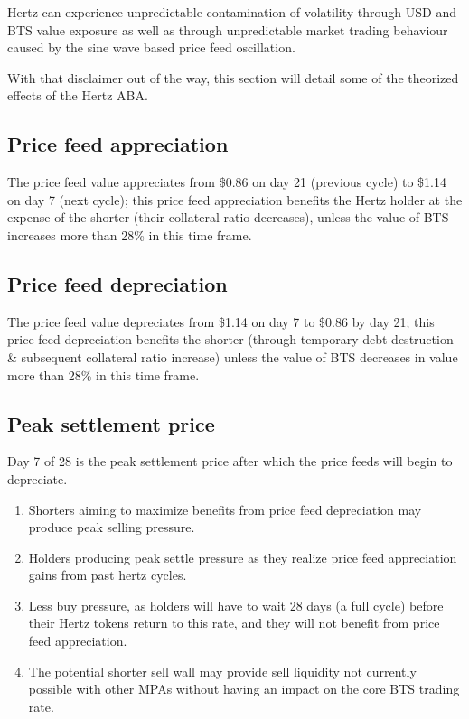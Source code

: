 \documentclass[sigconf]{acmart}
\begin{document}
Hertz can experience unpredictable contamination of volatility through USD and BTS value exposure as well as through unpredictable market trading behaviour caused by the sine wave based price feed oscillation.

With that disclaimer out of the way, this section will detail some of the theorized effects of the Hertz ABA.

\subsection{Price feed appreciation}

The price feed value appreciates from \$0.86 on day 21 (previous cycle) to \$1.14 on day 7 (next cycle); this price feed appreciation benefits the Hertz holder at the expense of the shorter (their collateral ratio decreases), unless the value of BTS increases more than 28\% in this time frame.

\subsection{Price feed depreciation}

The price feed value depreciates from \$1.14 on day 7 to \$0.86 by day 21; this price feed depreciation benefits the shorter (through temporary debt destruction \& subsequent collateral ratio increase) unless the value of BTS decreases in value more than 28\% in this time frame.

\subsection{Peak settlement price}

Day 7 of 28 is the peak settlement price after which the price feeds will begin to depreciate.

\begin{enumerate}[wide, labelwidth=!, labelindent=0pt]
\item Shorters aiming to maximize benefits from price feed depreciation may produce peak selling pressure.
\item Holders producing peak settle pressure as they realize price feed appreciation gains from past hertz cycles.
\item Less buy pressure, as holders will have to wait 28 days (a full cycle) before their Hertz tokens return to this rate, and they will not benefit from price feed appreciation.
\item The potential shorter sell wall may provide sell liquidity not currently possible with other MPAs without having an impact on the core BTS trading rate.
\end{enumerate}
\end{document}
